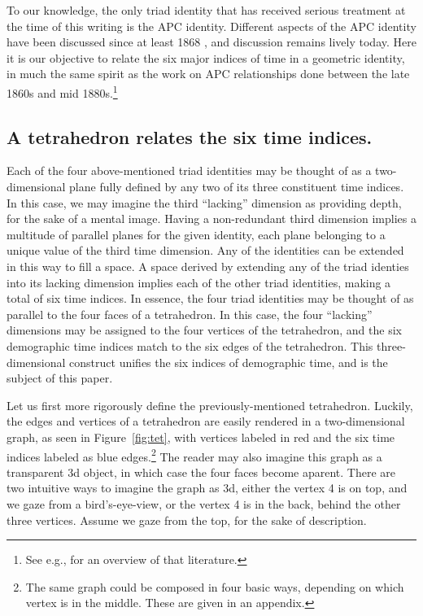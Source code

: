 \documentclass[11pt,oneside]{article} %
\newcommand\vt[1]{\textcolor{rd}{#1}}
\newcommand\eg[1]{\textcolor{bl}{#1}}
\begin{document}
To our knowledge, the only triad identity that has received serious
treatment at the time of this writing is the \eg{APC} identity. Different
aspects of the \eg{APC} identity have been discussed since at least 1868
\citep{knapp1868ermittlung}, and discussion remains lively today. Here it is our
objective to relate the six major indices of time in a geometric identity, in
much the same spirit as the work on \eg{APC} relationships done between the late
1860s and mid 1880s.\footnote{See e.g., \citet{keiding2011age} for an overview of that literature.} 

\subsection*{A tetrahedron relates the six time indices.}
Each of the four above-mentioned triad identities may be thought of as a
two-dimensional plane fully defined by any two of its three constituent time
indices.
In this case, we may imagine the third ``lacking'' dimension as providing
depth, for the sake of a mental image.
Having a non-redundant third dimension implies a multitude of parallel planes
for the given identity, each plane belonging to a unique value of the third time dimension. Any of the
identities can be extended in this way to fill a space. A space derived by
extending any of the triad identies into its lacking dimension implies each of the
other triad identities, making a total of six time indices. In essence, the
four triad identities may be thought of as parallel to the four faces of a
tetrahedron. In this case, the four ``lacking'' dimensions may be assigned to
the four vertices of the tetrahedron, and the six demographic time indices match
to the six edges of the tetrahedron. This three-dimensional construct
unifies the six indices of demographic time, and is the subject of this paper.

Let us first more rigorously define the previously-mentioned tetrahedron.
Luckily, the edges and vertices of a tetrahedron are easily rendered in a
two-dimensional graph, as seen in Figure~\ref{fig:tet}, with vertices labeled
in red and the six time indices labeled as blue edges.\footnote{The same graph
could be composed in four basic ways, depending on which vertex is in the
middle. These are given in an appendix.} The reader may also imagine this graph
as a transparent 3d object, in which case the four faces become aparent. There are two intuitive ways to imagine the graph as 3d, either the vertex \vt{4} is on top, and we gaze from a bird's-eye-view, or the
vertex \vt{4} is in the back, behind the other three vertices. Assume we
gaze from the top, for the sake of description. 
\end{document}
